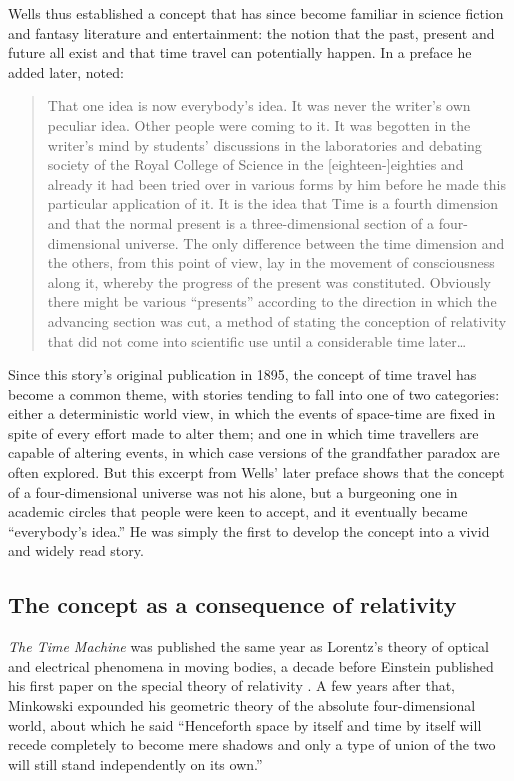 \documentclass[aps,rmp,groupedaddress,twocolumn,10pt]{revtex4-2}
\begin{document}
Wells thus established a concept that has since become familiar in science fiction and fantasy literature and entertainment: the notion that the past, present and future all exist and that time travel can potentially happen. In a preface he added later, \citet{Wells1931} noted:
\begin{quote}
    That one idea is now everybody's idea. It was never the writer's own peculiar idea. Other people were coming to it. It was begotten in the writer's mind by students' discussions in the laboratories and debating society of the Royal College of Science in the [eighteen-]eighties and already it had been tried over in various forms by him before he made this particular application of it. It is the idea that Time is a fourth dimension and that the normal present is a three-dimensional section of a four-dimensional universe. The only difference between the time dimension and the others, from this point of view, lay in the movement of consciousness along it, whereby the progress of the present was constituted. Obviously there might be various ``presents'' according to the direction in which the advancing section was cut, a method of stating the conception of relativity that did not come into scientific use until a considerable time later\ldots
\end{quote}

Since this story's original publication in 1895, the concept of time travel has become a common theme, with stories tending to fall into one of two categories: either a deterministic world view, in which the events of space-time are fixed in spite of every effort made to alter them; and one in which time travellers are capable of altering events, in which case versions of the grandfather paradox are often explored. But this excerpt from Wells' later preface shows that the concept of a four-dimensional universe was not his alone, but a burgeoning one in academic circles that people were keen to accept, and it eventually became ``everybody's idea.'' He was simply the first to develop the concept into a vivid and widely read story.

\subsection{The concept as a consequence of relativity}

\textit{The Time Machine} was published the same year as Lorentz's theory of optical and electrical phenomena in moving bodies, a decade before Einstein published his first paper on the special theory of relativity \cite{Einstein1952}. A few years after that, Minkowski expounded his geometric theory of the absolute four-dimensional world, about which he said \cite{Einstein1952} ``Henceforth space by itself and time by itself will recede completely to become mere shadows and only a type of union of the two will still stand independently on its own.''
\end{document}
